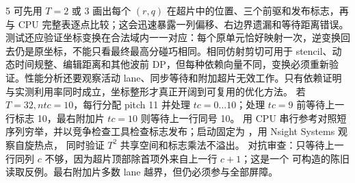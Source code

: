 \begin{solutionexercise}{5}
可先用 $T=2$ 或 3 画出每个 $(r,q)$ 在超片中的位置、三个前驱和发布标志，再与 CPU 完整表逐点比较；这会迅速暴露一列偏移、右边界遗漏和等待距离错误。测试还应验证坐标变换在合法域内一一对应：每个原单元恰好映射一次，逆变换回去仍是原坐标，不能只看最终最高分碰巧相同。相同仿射剪切可用于 stencil、动态时间规整、编辑距离和其他波前 DP，但每种依赖向量不同，变换必须重新验证。性能分析还要观察活动 lane、同步等待和附加超片无效工作。只有依赖证明与实测利用率同时成立，坐标整形才真正开阔到可复用的优化方法。
\variantheading 若 $T=32,ntc=10$，每行分配 pitch 11 并处理 $tc=0\ldots10$；处理
$tc=9$ 前等待上一行标志 10，最右附加片 $tc=10$ 则等待上一行同号 10。
\practiceheading 用 CPU 串行参考对照短序列穷举，并以竞争检查工具检查标志发布；启动固定为
，用 Nsight Systems 观察自旋热点，
同时验证 $T^2$ 共享空间和标志乘法不溢出。
对抗审查：只等待上一行同列 $c$ 不够，因为超片顶部除首项外来自上一行 $c+1$；这是一个
可构造的陈旧读取反例。最右附加片多数 lane 越界，但仍必须参与全部屏障。
\end{solutionexercise}

